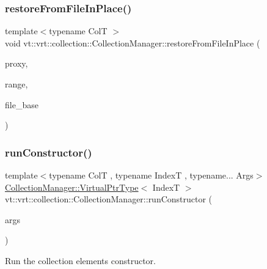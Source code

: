 \subsubsection{\texorpdfstring{restore\+From\+File\+In\+Place()}{restoreFromFileInPlace()}\hspace{0.1cm}{\footnotesize\ttfamily [2/2]}}
{\footnotesize\ttfamily template$<$typename ColT $>$ \\
void vt\+::vrt\+::collection\+::\+Collection\+Manager\+::restore\+From\+File\+In\+Place (\begin{DoxyParamCaption}\item[{\hyperlink{structvt_1_1vrt_1_1collection_1_1_collection_manager_a56458ed7f9bb22b631b9b3a745f42f94}{Collection\+Proxy\+Wrap\+Type}$<$ ColT $>$}]{proxy,  }\item[{\mbox{[}\mbox{[}maybe\+\_\+unused\mbox{]} \mbox{]} typename Col\+T\+::\+Index\+Type}]{range,  }\item[{std\+::string const \&}]{file\+\_\+base }\end{DoxyParamCaption})}

\mbox{\label{structvt_1_1vrt_1_1collection_1_1_collection_manager_ad9a0b889d763dd4eae462b9ca6d07cc9}} 
\subsubsection{\texorpdfstring{run\+Constructor()}{runConstructor()}}
{\footnotesize\ttfamily template$<$typename ColT , typename IndexT , typename... Args$>$ \\
\hyperlink{structvt_1_1vrt_1_1collection_1_1_collection_manager_a086cab4af6af4f869fbf8814c3a9a6a4}{Collection\+Manager\+::\+Virtual\+Ptr\+Type}$<$ IndexT $>$ vt\+::vrt\+::collection\+::\+Collection\+Manager\+::run\+Constructor (\begin{DoxyParamCaption}\item[{Args \&\&...}]{args }\end{DoxyParamCaption})\hspace{0.3cm}{\ttfamily [static]}}



Run the collection element\textquotesingle{}s constructor. 


